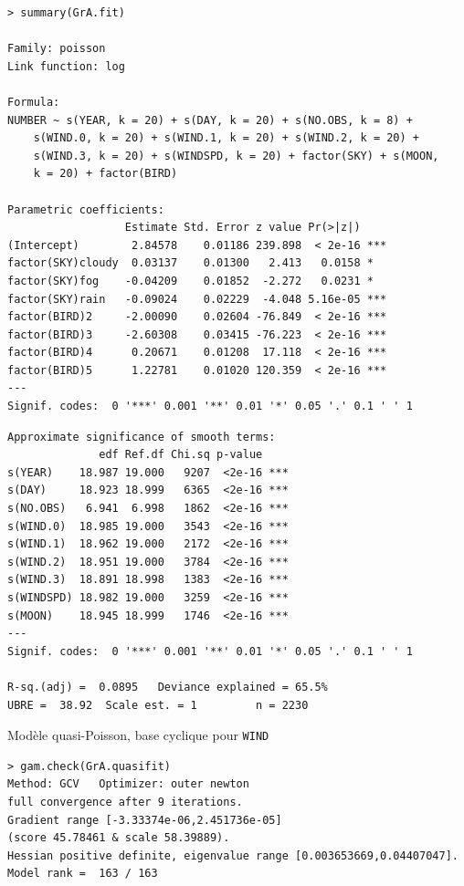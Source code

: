 \documentclass{BeamerTemplate}
\begin{document}
\begin{refsection}
\begin{frame}[fragile]{}
{\scriptsize
\begin{verbatim}
> summary(GrA.fit)

Family: poisson 
Link function: log 

Formula:
NUMBER ~ s(YEAR, k = 20) + s(DAY, k = 20) + s(NO.OBS, k = 8) + 
    s(WIND.0, k = 20) + s(WIND.1, k = 20) + s(WIND.2, k = 20) + 
    s(WIND.3, k = 20) + s(WINDSPD, k = 20) + factor(SKY) + s(MOON, 
    k = 20) + factor(BIRD)

Parametric coefficients:
                  Estimate Std. Error z value Pr(>|z|)    
(Intercept)        2.84578    0.01186 239.898  < 2e-16 ***
factor(SKY)cloudy  0.03137    0.01300   2.413   0.0158 *  
factor(SKY)fog    -0.04209    0.01852  -2.272   0.0231 *  
factor(SKY)rain   -0.09024    0.02229  -4.048 5.16e-05 ***
factor(BIRD)2     -2.00090    0.02604 -76.849  < 2e-16 ***
factor(BIRD)3     -2.60308    0.03415 -76.223  < 2e-16 ***
factor(BIRD)4      0.20671    0.01208  17.118  < 2e-16 ***
factor(BIRD)5      1.22781    0.01020 120.359  < 2e-16 ***
---
Signif. codes:  0 '***' 0.001 '**' 0.01 '*' 0.05 '.' 0.1 ' ' 1

\end{verbatim}
}
\end{frame}

\begin{frame}[fragile]{}

{\scriptsize
\begin{verbatim}
Approximate significance of smooth terms:
              edf Ref.df Chi.sq p-value    
s(YEAR)    18.987 19.000   9207  <2e-16 ***
s(DAY)     18.923 18.999   6365  <2e-16 ***
s(NO.OBS)   6.941  6.998   1862  <2e-16 ***
s(WIND.0)  18.985 19.000   3543  <2e-16 ***
s(WIND.1)  18.962 19.000   2172  <2e-16 ***
s(WIND.2)  18.951 19.000   3784  <2e-16 ***
s(WIND.3)  18.891 18.998   1383  <2e-16 ***
s(WINDSPD) 18.982 19.000   3259  <2e-16 ***
s(MOON)    18.945 18.999   1746  <2e-16 ***
---
Signif. codes:  0 '***' 0.001 '**' 0.01 '*' 0.05 '.' 0.1 ' ' 1

R-sq.(adj) =  0.0895   Deviance explained = 65.5%
UBRE =  38.92  Scale est. = 1         n = 2230
\end{verbatim}
}
\end{frame}


\begin{frame}[fragile]{Modèle quasi-Poisson, base cyclique pour \texttt{WIND}}

{\scriptsize
\begin{verbatim}
> gam.check(GrA.quasifit)
Method: GCV   Optimizer: outer newton
full convergence after 9 iterations.
Gradient range [-3.33374e-06,2.451736e-05]
(score 45.78461 & scale 58.39889).
Hessian positive definite, eigenvalue range [0.003653669,0.04407047].
Model rank =  163 / 163 


\end{verbatim}}
\end{frame}
\end{refsection}
\end{document}
